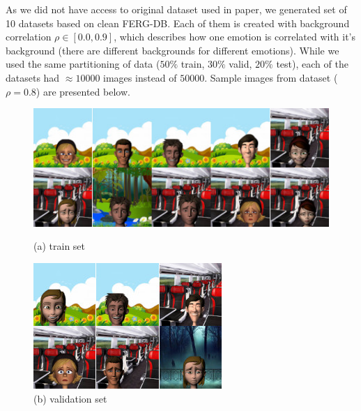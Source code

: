 \documentclass{article} %
\begin{document}
\pagebreak

As we did not have access to original dataset used in paper, we generated set of 10 datasets based on clean FERG-DB. 
Each of them is created with background correlation $\rho \in[0.0, 0.9]$, which describes how one emotion is correlated with it's background (there are different backgrounds for different emotions).
While we used the same partitioning of data ($50\%$ train, $30\%$ valid, $20\%$ test), each of the datasets had $\approx 10 000$ 
images instead of $50 000$. Sample images from dataset ($\rho=0.8$) are presented below.

\begin{figure}[h]
    \includegraphics[width=\textwidth]{res/train.jpg}
    \caption*{(a) train set}
    \endminipage\hfill
    \includegraphics[width=\textwidth]{res/valid.jpg}
    \caption*{(b) validation set}
    \endminipage\hfill

\end{figure}
\end{document}
